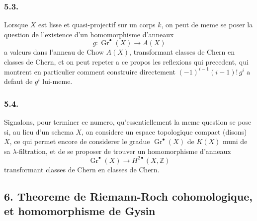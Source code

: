 \subsubsection*{5.3.}
Lorsque $X$ est lisse et quasi-projectif sur un corps $k$, on peut de meme se poser la question de l'existence d'un homomorphisme d'anneaux
\[
g : \operatorname{Gr}^{\bullet}(X) \longrightarrow A(X)
\]
a valeurs dans l'anneau de Chow $A(X)$, transformant classes de Chern en classes de Chern, et on peut repeter a ce propos les reflexions qui precedent, qui montrent en particulier comment construire directement $(-1)^{i-1}(i-1)! \, g^{i}$ a defaut de $g^{i}$ lui-meme.

\subsubsection*{5.4.}
Signalons, pour terminer ce numero, qu'essentiellement la meme question se pose si, au lieu d'un schema $X$, on considere un espace topologique compact (disons) $X$, ce qui permet encore de considerer le gradue $\operatorname{Gr}^{\bullet}(X)$ de $K(X)$ muni de sa $\lambda$-filtration, et de se proposer de trouver un homomorphisme d'anneaux
\[
\operatorname{Gr}^{\bullet}(X) \longrightarrow H^{2\bullet}(X, \mathbb{Z})
\]
transformant classes de Chern en classes de Chern.


\subsection*{6. Theoreme de Riemann-Roch cohomologique, et homomorphisme de Gysin}

